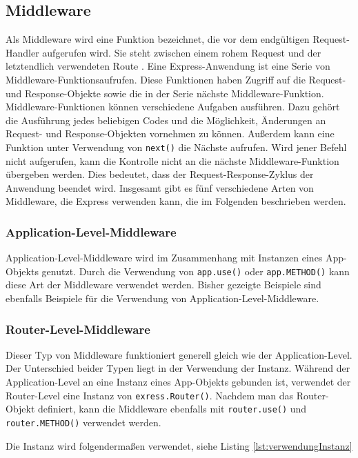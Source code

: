 \subsection{Middleware}

Als Middleware wird eine Funktion bezeichnet, die vor dem endgültigen Request-Handler aufgerufen wird. Sie steht zwischen einem rohem Request und der letztendlich verwendeten Route \cite{nsieben}.
Eine Express-Anwendung ist eine Serie von Middleware-Funktionsaufrufen. Diese Funktionen haben Zugriff auf die Request- und Response-Objekte sowie die in der Serie nächste Middleware-Funktion. 
Middleware-Funktionen können verschiedene Aufgaben ausführen. Dazu gehört die Ausführung jedes beliebigen Codes und die Möglichkeit, Änderungen an Request- und Response-Objekten vornehmen zu können. Außerdem kann eine Funktion unter Verwendung von \texttt{next()} die Nächste aufrufen. Wird jener Befehl nicht aufgerufen, kann die Kontrolle nicht an die nächste Middleware-Funktion übergeben werden. Dies bedeutet, dass der Request-Response-Zyklus der Anwendung beendet wird.
Insgesamt gibt es fünf verschiedene Arten von Middleware, die Express verwenden kann, die im Folgenden beschrieben werden. 

\subsubsection{Application-Level-Middleware}

Application-Level-Middleware wird im Zusammenhang mit Instanzen eines App-Objekts genutzt. Durch die Verwendung von \texttt{app.use()} oder \texttt{app.METHOD()} kann diese Art der Middleware verwendet werden. Bisher gezeigte Beispiele sind ebenfalls Beispiele für die Verwendung von Application-Level-Middleware.

\subsubsection{Router-Level-Middleware}

Dieser Typ von Middleware funktioniert generell gleich wie der Application-Level. Der Unterschied beider Typen liegt in der Verwendung der Instanz. Während der Application-Level an eine Instanz eines App-Objekts gebunden ist, verwendet der Router-Level eine Instanz von \texttt{exress.Router()}. Nachdem man das Router-Objekt definiert, kann die Middleware ebenfalls mit \texttt{router.use()} und \texttt{router.METHOD()} verwendet werden. 

Die Instanz wird folgendermaßen verwendet, siehe Listing \ref*{lst:verwendungInstanz}

